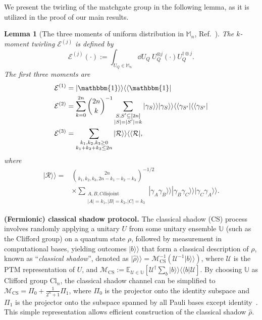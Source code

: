 \documentclass[journal=jctcce,a4paper,manuscript=article]{achemso}
\newtheorem{lemma}{Lemma}
\newcommand{\supket}[1]{|#1 \rangle\rangle}
\newcommand{\supbra}[1]{\langle\langle #1 |}
\newcommand{\sbra}[1]{\left[ #1 \right]}
\newcommand{\Ecal}{\mathcal{E}}
\newcommand{\Rcal}{\mathcal{R}}
\newcommand{\Ucal}{\mathcal{U}}
\newcommand{\Mcal}{\mathcal{M}}
\newcommand{\Ubb}{\mathbb{U}}
\newcommand{\Mbb}{\mathbb{M}}
\newcommand{\Ebb}{\mathbb{E}}
\begin{document}
We present the twirling of the matchgate group in the following lemma, as it is
utilized in the proof of our main results.
\begin{lemma}[The three moments of uniform distribution in $\Mbb_n$, Ref.~\cite{wan2022matchgate}]
  \label{lemma: 1}
  The $k$-moment twirling $\Ecal^{(j)}$ is defined by
  \begin{equation}
    \Ecal^{(j)}(\cdot):=\int_{U_Q \in \Mbb_n} \dd U_Q ~ U_Q^{\otimes j} (\cdot ) U_Q ^{\dagger \otimes j}.
  \end{equation}
  The first three moments are
  \begin{equation}
    \begin{aligned}
      \Ecal^{(1)} & = \supket{\mathbbm{1}}\supbra{\mathbbm{1}}                             \\
      \Ecal^{(2)} & = \sum_{k=0}^{2n} {2n\choose k}^{-1}\sum_{\substack{S,S'\subseteq [2n] \\ |S| = |S'| = k}} \supket{\gamma_S}\supket{\gamma_S}\supbra{\gamma_{S'}}\supbra{\gamma_{S'}} \\
      \Ecal^{(3)} & = \sum_{
      \substack{ k_1,k_2,k_3 \geq 0                                                        \\ k_1 + k_2+k_3\leq 2n }}\supket{\Rcal}\supbra{\Rcal} ,
    \end{aligned}
  \end{equation}
  where
  \begin{align}
    \supket{\Rcal}= & {2n \choose k_1,k_2,k_3, 2n - k_1-k_2-k_3}^{-1/2}  \nonumber \\
                    & \times \sum_{\substack{A,B,C \text{disjoint}                 \\
        |A|=k_1,|B|=k_2, |C| = k_3
      }
    }\supket{\gamma_{A} \gamma_{B}}\supket{\gamma_{B} \gamma_{C}} \supket{\gamma_{C} \gamma_{A}}.
  \end{align}

  \label{lem:FCS_shadow_channel}
\end{lemma}

\vspace{8pt}
\noindent\textbf{(Fermionic) classical shadow protocol.} The classical shadow (CS) process involves randomly applying a unitary $U$ from some unitary ensemble $\Ubb$ (such as the Clifford group) on a quantum state $\rho$, followed by measurement in computational bases, yielding outcomes $\supket{b}$ that form a classical description of $\rho$, known as ``\emph{classical shadow}'', denoted as $\supket{\hat{\rho}} = \mathcal{M}^{-1}_{\text{CS}}(\Ucal^{-1}\supket{b})$, where $\Ucal$ is the PTM representation of $U$, and $\mathcal{M}_{\text{CS}}:=\Ebb_{\Ucal\in\Ubb}\sbra{\Ucal^{\dagger}\sum_{b} \supket{b}\supbra{b} \Ucal}$. By choosing $\Ubb$ as Clifford group Cl$_n$, the classical shadow channel can be simplified to $\Mcal_{\text{CS}} = \Pi_0 + \frac{1}{2^n + 1}\Pi_1$, where $\Pi_0$ is the projector onto the identity subspace and $\Pi_1$ is the projector onto the subspace spanned by all Pauli bases except identity~\cite{huang2020predicting, chen2021robust}. This simple representation allows efficient construction of the classical shadow $\hat{\rho}$.
\end{document}
